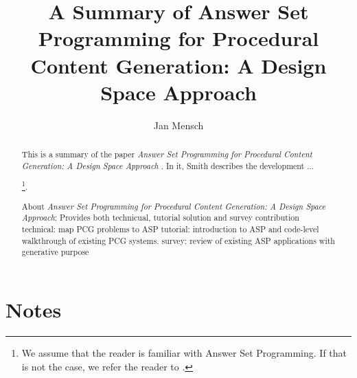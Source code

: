 \documentclass[runningheads]{llncs}
\newcommand{\papertitle}{Answer Set Programming for Procedural Content Generation: A Design Space Approach}
\newcommand{\authorquote}{Smith \etal}
\begin{document}
\title{A Summary of \papertitle}

\author{Jan Mensch}




%
\maketitle              %
%
\begin{abstract}
This is a summary of the paper \textit{\papertitle} \cite{smith2011answer}. In it, \authorquote{} describes the development ...

\footnote{We assume that the reader is familiar with Answer Set Programming. If that is not the case, we refer the reader to \cite{erdem2016applications}.}.

About \textit{\papertitle}:
Provides both technicual, tutorial solution and survey contribution
technical: map PCG problems to ASP
tutorial: introduction to ASP and code-level walkthrough of existing PCG systems.  
survey: review of existing ASP applications with generative purpose
\end{abstract}


\section{Notes} 

\end{document}
